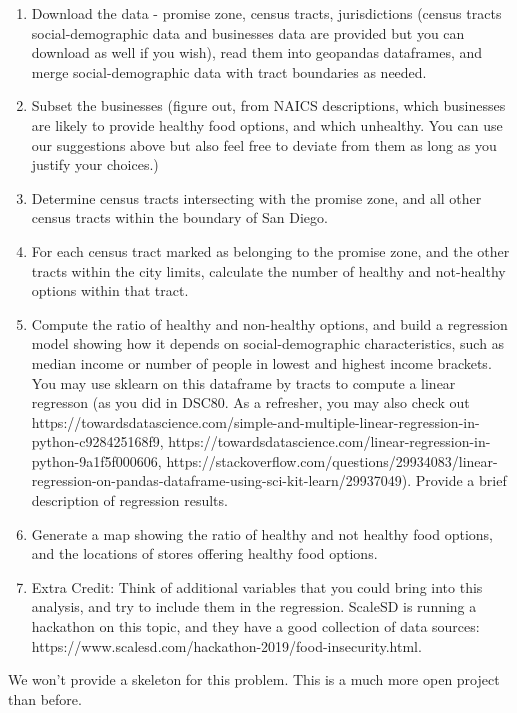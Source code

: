 \documentclass[11pt]{article}
\begin{document}
\begin{enumerate}
\def\labelenumi{\arabic{enumi}.}
\item
  Download the data - promise zone, census tracts, jurisdictions (census
  tracts social-demographic data and businesses data are provided but
  you can download as well if you wish), read them into geopandas
  dataframes, and merge social-demographic data with tract boundaries as
  needed.
\item
  Subset the businesses (figure out, from NAICS descriptions, which
  businesses are likely to provide healthy food options, and which
  unhealthy. You can use our suggestions above but also feel free to
  deviate from them as long as you justify your choices.)
\item
  Determine census tracts intersecting with the promise zone, and all
  other census tracts within the boundary of San Diego.
\item
  For each census tract marked as belonging to the promise zone, and the
  other tracts within the city limits, calculate the number of healthy
  and not-healthy options within that tract.
\item
  Compute the ratio of healthy and non-healthy options, and build a
  regression model showing how it depends on social-demographic
  characteristics, such as median income or number of people in lowest
  and highest income brackets. You may use sklearn on this dataframe by
  tracts to compute a linear regresson (as you did in DSC80. As a
  refresher, you may also check out
  https://towardsdatascience.com/simple-and-multiple-linear-regression-in-python-c928425168f9,
  https://towardsdatascience.com/linear-regression-in-python-9a1f5f000606,
  https://stackoverflow.com/questions/29934083/linear-regression-on-pandas-dataframe-using-sci-kit-learn/29937049).
  Provide a brief description of regression results.
\item
  Generate a map showing the ratio of healthy and not healthy food
  options, and the locations of stores offering healthy food options.
\item
  Extra Credit: Think of additional variables that you could bring into
  this analysis, and try to include them in the regression. ScaleSD is
  running a hackathon on this topic, and they have a good collection of
  data sources:
  https://www.scalesd.com/hackathon-2019/food-insecurity.html.
\end{enumerate}

We won't provide a skeleton for this problem. This is a much more open
project than before.
\end{document}

